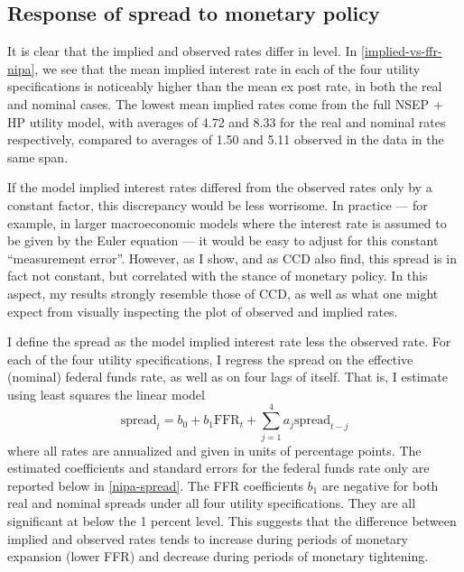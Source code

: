 \subsection{Response of spread to monetary policy}
It is clear that the implied and observed rates differ in level. In \autoref{implied-vs-ffr-nipa}, we see that the mean implied interest rate in each of the four utility specifications is noticeably higher than the mean ex post rate, in both the real and nominal cases. The lowest mean implied rates come from the full NSEP + HP utility model, with averages of 4.72 and 8.33 for the real and nominal rates respectively, compared to averages of 1.50 and 5.11 observed in the data in the same span.

If the model implied interest rates differed from the observed rates only by a constant factor, this discrepancy would be less worrisome. In practice --- for example, in larger macroeconomic models where the interest rate is assumed to be given by the Euler equation --- it would be easy to adjust for this constant ``measurement error''. However, as I show, and as CCD also find, this spread is in fact not constant, but correlated with the stance of monetary policy. In this aspect, my results strongly resemble those of CCD, as well as what one might expect from visually inspecting the plot of observed and implied rates.

I define the spread as the model implied interest rate less the observed rate. For each of the four utility specifications, I regress the spread on the effective (nominal) federal funds rate, as well as on four lags of itself. That is, I estimate using least squares the linear model
\begin{equation}
\label{spread-ffr-regression}
\mathrm{spread}_t = b_0 + b_1 \mathrm{FFR}_t + \sum_{j=1}^4 a_j \mathrm{spread}_{t-j}
\end{equation}
where all rates are annualized and given in units of percentage points. The estimated coefficients and standard errors for the federal funds rate only are reported below in \autoref{nipa-spread}. The FFR coefficients $b_1$ are negative for both real and nominal spreads under all four utility specifications. They are all significant at below the 1 percent level. This suggests that the difference between implied and observed rates tends to increase during periods of monetary expansion (lower FFR) and decrease during periods of monetary tightening.

